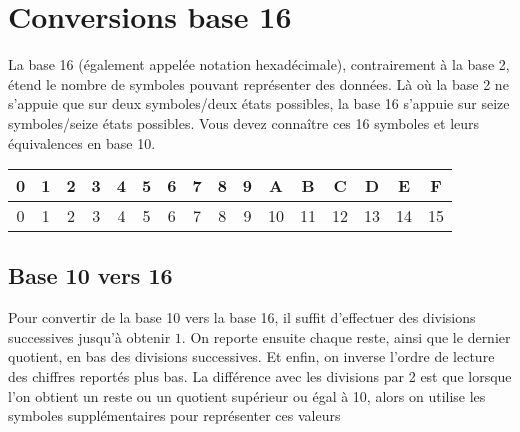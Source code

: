 \documentclass[11pt,a4paper]{article}
\begin{document}

\section{Conversions base 16}

\bigskip

La base 16 (également appelée notation hexadécimale), contrairement à la base 2, étend le nombre de symboles pouvant représenter des données.
Là où la base 2 ne s'appuie que sur deux symboles/deux états possibles, la base 16 s'appuie sur seize symboles/seize états possibles.
Vous devez connaître ces 16 symboles et leurs équivalences en base 10.

\bigskip

\begin{center}
\begin{tabular}{ | c c c c c | c c c c c | c c c c c c | }
\hline
\textbf{0} & \textbf{1} & \textbf{2} & \textbf{3} & \textbf{4}  &  \textbf{5} & \textbf{6} & \textbf{7} & \textbf{8} & \textbf{9}  &   \textbf{A} &  \textbf{B} &  \textbf{C} &  \textbf{D} &  \textbf{E} &  \textbf{F} \\
\hline
0 & 1 & 2 & 3 & 4  &  5 & 6 & 7 & 8 & 9  &  10 & 11 & 12 & 13 & 14 & 15 \\
\hline
\end{tabular}
\end{center}

\bigskip


\subsection{Base 10 vers 16}

\bigskip

Pour convertir de la base 10 vers la base 16, il suffit d'effectuer des divisions successives jusqu'à obtenir $ 1 $.
On reporte ensuite chaque reste, ainsi que le dernier quotient, en bas des divisions successives.
Et enfin, on inverse l'ordre de lecture des chiffres reportés plus bas.
La différence avec les divisions par 2 est que lorsque l'on obtient un reste ou un quotient supérieur ou égal à 10, alors on utilise les symboles supplémentaires pour représenter ces valeurs

\bigskip
\end{document}
